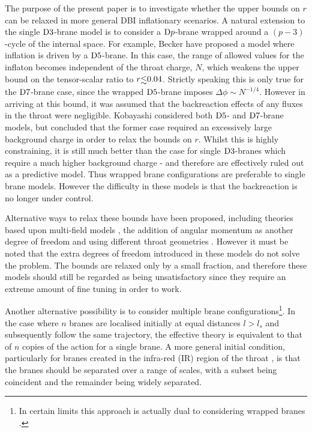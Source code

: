 The purpose of the present paper is to investigate whether the 
upper bounds on $r$ can be relaxed in more general DBI 
inflationary scenarios. 
A natural extension to the single ${\rm D3}$-brane model 
is to consider a ${\rm D}p$-brane wrapped around a $(p-3)$-cycle of the 
internal space. For example, Becker \etal \cite{Becker:2007ui} 
have proposed a model where inflation is driven by a ${\rm D5}$-brane. 
In this case, the range of allowed values for the inflaton 
becomes independent of the throat charge, $N$, which weakens the upper bound on 
the tensor-scalar ratio to $r \lsim 0.04$. Strictly speaking this is 
only true for the ${\rm D7}$-brane case, since the
wrapped ${\rm D5}$-brane imposes 
$\Delta \phi \sim N^{-1/4}$.
However in arriving at this bound, it was assumed that the 
backreaction effects of any fluxes in the throat were 
negligible. Kobayashi \etal \cite{Kobayashi:2007hm} 
considered both ${\rm D5}$- and
${\rm D7}$-brane models, but concluded that the former case
required an excessively large background charge in 
order to relax the bounds on $r$. Whilst this is highly constraining, it is still much better than
the
case for single ${\rm D3}$-branes which require a much higher background charge - and therefore are
effectively ruled
out as a predictive model. Thus wrapped brane configurations are preferable to single brane models.
However
the difficulty in these models is that the backreaction is no longer under control.

Alternative ways to relax these bounds have been proposed, including
theories based upon multi-field models \cite{Huang:2007hh}, the addition of
angular momentum as another degree of freedom \cite{spinflation} and using
different throat geometries \cite{Gmeiner:2007uw}. However it must be noted that
the extra degrees of freedom introduced in these models do not solve the problem. The 
bounds are relaxed only by a small fraction, and therefore these models should still be 
regarded as being unsatisfactory since they require an extreme amount of fine tuning in order
to work.

Another alternative possibility is to consider 
multiple brane configurations\footnote{In certain limits this approach 
is actually dual to considering wrapped branes \cite{Ward:2007gs}.}. 
In the case where  
$n$ branes are localised initially at equal distances $l > l_s$ and 
subsequently follow the same trajectory, 
the effective theory is equivalent to that of $n$ copies of the
action for a single brane. A more general initial condition, particularly
for branes created in the infra-red (IR) region of the throat
\cite{brane13, DeWolfe:2004qx, Kachru:2002gs}, is that
the branes should be separated over a range of scales, 
with a subset being coincident and the remainder being widely separated. 


